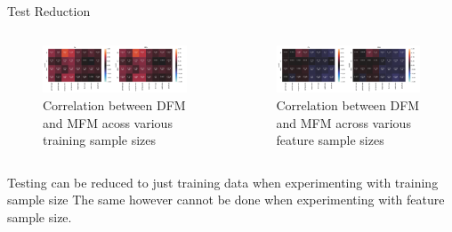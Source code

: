 \documentclass[aspectratio=169]{beamer}
\begin{document}
\begin{frame}[t]{Test Reduction}
  \begin{columns}[t, onlytextwidth]
    \begin{figure}
      \centering
      \includegraphics[height=0.2\textheight, keepaspectratio]{heatmap--corr--frac.pdf}
      \caption{Correlation between DFM and MFM acoss various training
        sample sizes}
    \end{figure}

    \begin{figure}
      \centering
      \includegraphics[height=0.2\textheight, keepaspectratio]{heatmap--corr--num-features.pdf}
      \caption{Correlation between DFM and MFM across various feature
        sample sizes}
    \end{figure}
  \end{columns}

  \vfill

  \begin{exampleblock}{Testing can be reduced to just training data
    when experimenting with training sample size}
    The same however \alert{cannot} be done when experimenting with
    feature sample size.
  \end{exampleblock}
\end{frame}
\end{document}
